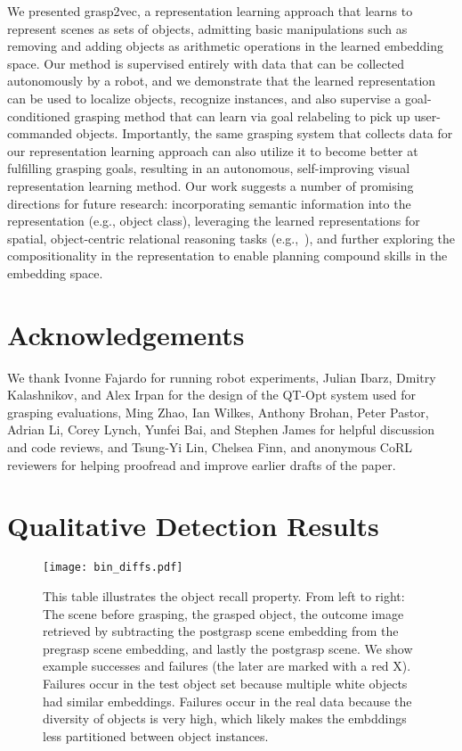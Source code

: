 \documentclass{article}
\begin{document}
We presented grasp2vec, a representation learning approach that learns to represent scenes as sets of objects, admitting basic manipulations such as removing and adding objects as arithmetic operations in the learned embedding space. Our method is supervised entirely with data that can be collected autonomously by a robot, and we demonstrate that the learned representation can be used to localize objects, recognize instances, and also supervise a goal-conditioned grasping method that can learn via goal relabeling to pick up user-commanded objects. Importantly, the same grasping system that collects data for our representation learning approach can also utilize it to become better at fulfilling grasping goals, resulting in an autonomous, self-improving visual representation learning method. Our work suggests a number of promising directions for future research: incorporating semantic information into the representation (e.g., object class), leveraging the learned representations for spatial, object-centric relational reasoning tasks (e.g.,~\cite{johnson2017clevr}), and further exploring the compositionality in the representation to enable planning compound skills in the embedding space.

\section{Acknowledgements}

We thank Ivonne Fajardo for running robot experiments, Julian Ibarz, Dmitry Kalashnikov, and Alex Irpan for the design of the QT-Opt system used for grasping evaluations, Ming Zhao, Ian Wilkes, Anthony Brohan, Peter Pastor, Adrian Li, Corey Lynch, Yunfei Bai, and Stephen James for helpful discussion and code reviews, and Tsung-Yi Lin, Chelsea Finn, and anonymous CoRL reviewers for helping proofread and improve earlier drafts of the paper.


\newpage

\appendix

\section{Qualitative Detection Results}
\label{app:embeddings}
\begin{figure}[h]
\centering
\texttt{[image: bin\_diffs.pdf]}
\caption{This table illustrates the object recall property. From left to right: The scene before grasping, the grasped object, the outcome image retrieved by subtracting the postgrasp scene embedding from the pregrasp scene embedding, and lastly the postgrasp scene. We show example successes and failures (the later are marked with a red X). Failures occur in the test object set because multiple white objects had similar embeddings. Failures occur in the real data because the diversity of objects is very high, which likely makes the embddings less partitioned between object instances.}
\end{figure}
\end{document}
